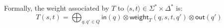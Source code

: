\documentclass[runningheads]{llncs}
\def\endex{\hspace*{\fill} $\Diamond$\smallskip }
{\theorembodyfont{\rmfamily} \theoremstyle{break} \newtheorem{algo}{Algorithm}}
\def\<#1>{\langle #1 \rangle}
\newcommand{\Semiring}{\mathbb{S}}
\def\SWT{\textsf{swT}\xspace}
\def\weight{\mathsf{weight}}
\def\wei{\mathsf{w}}
\def\init{\mathsf{in}}
\def\final{\mathsf{out}}
\begin{document}
\medskip\noindent
Formally, the weight associated by $T$ to $\< s, t> \in \Sigma^* \times \Delta^*$ is: 
\begin{equation}
T(s, t)  = 
\displaystyle\bigoplus_{q, q' \in Q} \init(q) 
\mathop{\otimes} \weight_T(q, s, t, q') \mathop{\otimes} \final(q')
\label{eq:SWT-value}
\end{equation}

%
\end{document}
